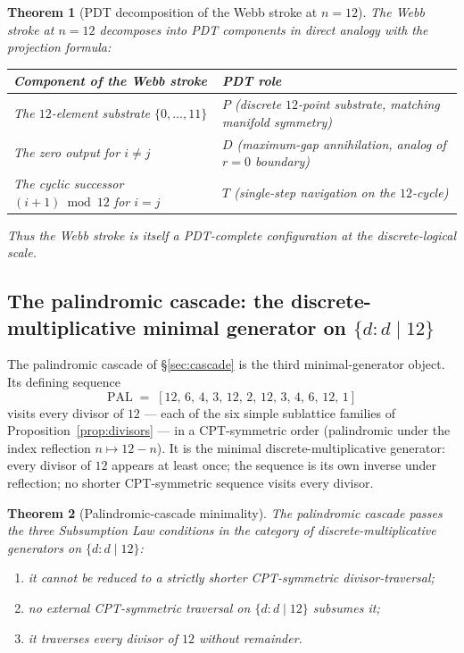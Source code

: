 \documentclass[11pt,a4paper]{article}
\newtheorem{theorem}{Theorem}[section]
\theoremstyle{definition}
\theoremstyle{remark}
\begin{document}
\begin{theorem}[PDT decomposition of the Webb stroke at $n=12$]\label{thm:webb-pdt}
The Webb stroke at $n=12$ decomposes into PDT components in direct analogy with the projection formula:
\begin{center}
\begin{tabularx}{\textwidth}{@{}XX@{}}
\toprule
Component of the Webb stroke & PDT role\\
\midrule
The $12$-element substrate $\{0,\ldots,11\}$ & $P$ (discrete $12$-point substrate, matching manifold symmetry)\\
The zero output for $i\ne j$ & $D$ (maximum-gap annihilation, analog of $r=0$ boundary)\\
The cyclic successor $(i+1)\bmod 12$ for $i=j$ & $T$ (single-step navigation on the $12$-cycle)\\
\bottomrule
\end{tabularx}
\end{center}
Thus the Webb stroke is itself a PDT-complete configuration at the discrete-logical scale.
\end{theorem}

\subsection{The palindromic cascade: the discrete-multiplicative minimal generator on $\{d:d\mid 12\}$}\label{subsec:palindromic}

The palindromic cascade of \S\ref{sec:cascade} is the third minimal-generator object. Its defining sequence
\[
\text{PAL} \;=\; [12,\,6,\,4,\,3,\,12,\,2,\,12,\,3,\,4,\,6,\,12,\,1]
\]
visits every divisor of $12$ --- each of the six simple sublattice families of Proposition~\ref{prop:divisors} --- in a CPT-symmetric order (palindromic under the index reflection $n\mapsto 12-n$). It is the minimal discrete-multiplicative generator: every divisor of $12$ appears at least once; the sequence is its own inverse under reflection; no shorter CPT-symmetric sequence visits every divisor.

\begin{theorem}[Palindromic-cascade minimality]\label{thm:palindromic-minimal}
The palindromic cascade passes the three Subsumption Law conditions in the category of discrete-multiplicative generators on $\{d : d \mid 12\}$:
\begin{enumerate}[label=(\roman*),leftmargin=*]
\item it cannot be reduced to a strictly shorter CPT-symmetric divisor-traversal;
\item no external CPT-symmetric traversal on $\{d:d\mid 12\}$ subsumes it;
\item it traverses every divisor of $12$ without remainder.
\end{enumerate}
\end{theorem}
\end{document}
